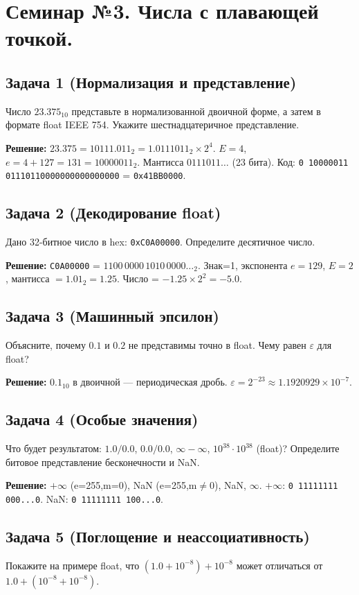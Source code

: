 \documentclass[a4paper,14pt]{report}
\begin{document}
\section{Семинар №3. Числа с плавающей точкой.}

\subsection*{Задача 1 (Нормализация и представление)}
Число $23.375_{10}$ представьте в нормализованной двоичной форме, а затем в формате float IEEE 754. Укажите шестнадцатеричное представление.

\textbf{Решение:}
$23.375 = 10111.011_2 = 1.0111011_2 \times 2^4$. $E=4$, $e=4+127=131=10000011_2$. Мантисса $0111011\ldots$ (23 бита). Код: \texttt{0 10000011 01110110000000000000000} = \texttt{0x41BB0000}.

\subsection*{Задача 2 (Декодирование float)}
Дано 32-битное число в hex: \texttt{0xC0A00000}. Определите десятичное число.

\textbf{Решение:}
\texttt{C0A00000} = $1100\,0000\,1010\,0000\ldots_2$. Знак=1, экспонента $e=129$, $E=2$, мантисса $=1.01_2=1.25$. Число = $-1.25 \times 2^2 = -5.0$.

\subsection*{Задача 3 (Машинный эпсилон)}
Объясните, почему $0.1$ и $0.2$ не представимы точно в float. Чему равен $\varepsilon$ для float?

\textbf{Решение:}
$0.1_{10}$ в двоичной — периодическая дробь. $\varepsilon = 2^{-23} \approx 1.1920929\times10^{-7}$.

\subsection*{Задача 4 (Особые значения)}
Что будет результатом: $1.0/0.0$, $0.0/0.0$, $\infty-\infty$, $10^{38}\cdot10^{38}$ (float)? Определите битовое представление бесконечности и NaN.

\textbf{Решение:}
$+\infty$ (e=255,m=0), NaN (e=255,m$\neq$0), NaN, $\infty$. $+\infty$: \texttt{0 11111111 000...0}. NaN: \texttt{0 11111111 100...0}.

\subsection*{Задача 5 (Поглощение и неассоциативность)}
Покажите на примере float, что $(1.0 + 10^{-8}) + 10^{-8}$ может отличаться от $1.0 + (10^{-8} + 10^{-8})$.
\end{document}
